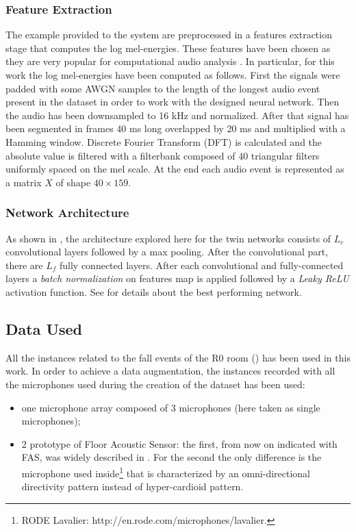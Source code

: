 \subsubsection{Feature Extraction}
The example provided to the system are preprocessed in a features extraction stage that computes the log mel-energies. These features have been chosen as they are very popular for computational audio analysis \cite{gemmeke2013exemplar,parascandolo2017convolutional,mesaros2010acoustic}.
In particular, for this work the log mel-energies have been computed as follows.
First the signals were padded with some AWGN samples to the length of the longest audio event present in the dataset in order to work with the designed neural network.
Then the audio has been downsampled to 16 kHz and normalized. After that signal has been segmented in frames 40 ms long overlapped
by 20 ms and multiplied with a Hamming window. Discrete Fourier Transform (DFT) is calculated and the absolute value is filtered with a filterbank composed of 40 triangular filters uniformly spaced on the mel scale. At the end each audio event is represented as a matrix $X$ of shape $40\times159$.  

\subsubsection{Network Architecture}
As shown in , the architecture explored here for the twin networks consists of $L_c$ convolutional layers followed by a max pooling. After the convolutional part, there are $L_f$ fully connected layers. After each convolutional and fully-connected layers a \textsl{batch normalization} on features map is applied followed by a \textsl{Leaky ReLU} activation function.
See  for details about the best performing network. 



\subsection{Data Used}
All the instances related to the fall events of the R0 room () has been used in this work. In order to achieve a data augmentation, the instances recorded with all the microphones used during the creation of the dataset has been used:
\begin{itemize}
	\item one microphone array composed of 3 microphones (here taken as single microphones);
	\item 2 prototype of Floor Acoustic Sensor: the first, from now on indicated with FAS, was widely described in . For the second the only difference is the microphone used inside\footnote{RODE Lavalier: http://en.rode.com/microphones/lavalier.} that is characterized by an omni-directional directivity pattern instead of hyper-cardioid pattern.
\end{itemize}

